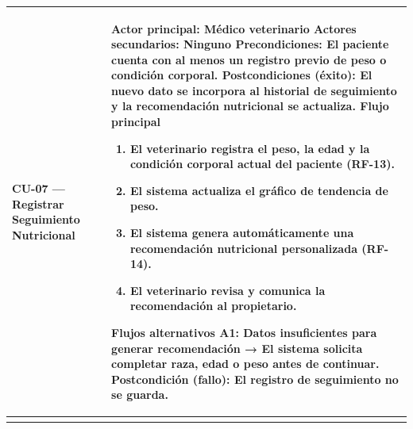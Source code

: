 \documentclass[
]{article}
\newcounter{none} %
\begin{document}
{\def\LTcaptype{none} %
\begin{longtable}[]{|
  >{\raggedright\arraybackslash}p{}|
  >{\raggedright\arraybackslash}p{}|}
\hline
\begin{minipage}[b]{\linewidth}\raggedright
\textbf{CU-07 --- Registrar Seguimiento Nutricional}
\end{minipage} & \begin{minipage}[b]{\linewidth}\raggedright
\textbf{Actor principal:} Médico veterinario \textbf{Actores
secundarios:} Ninguno \textbf{Precondiciones:} El paciente cuenta con al
menos un registro previo de peso o condición corporal. \textbf{Postcondiciones (éxito):} El nuevo dato se incorpora al
historial de seguimiento y la recomendación nutricional se actualiza. \textbf{Flujo principal}

\begin{enumerate}
\def\labelenumi{\arabic{enumi}.}
\item
  El veterinario registra el peso, la edad y la condición corporal
  actual del paciente (RF-13).
\item
  El sistema actualiza el gráfico de tendencia de peso.
\item
  El sistema genera automáticamente una recomendación nutricional
  personalizada (RF-14).
\item
  El veterinario revisa y comunica la recomendación al propietario.
\end{enumerate}

\textbf{Flujos alternativos} A1: Datos insuficientes para generar recomendación → El sistema solicita
completar raza, edad o peso antes de continuar. \textbf{Postcondición (fallo):} El registro de seguimiento no se guarda.
\end{minipage} \\
\hline
\endhead
\hline
\endlastfoot
\end{longtable}
}
\end{document}
